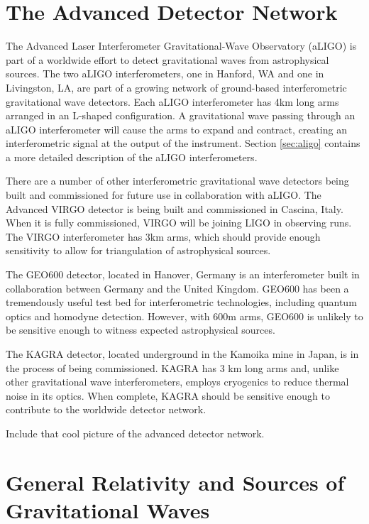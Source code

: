 \section{The Advanced Detector Network}

The Advanced Laser Interferometer Gravitational-Wave Observatory (aLIGO) is 
part of a worldwide effort to detect gravitational waves from astrophysical 
sources. The two aLIGO interferometers, one in Hanford, WA and one in 
Livingston, LA, are part of a growing network of ground-based interferometric 
gravitational wave detectors. Each aLIGO interferometer has 4km long arms 
arranged in an L-shaped configuration. A gravitational wave passing through 
an aLIGO interferometer will cause the arms to expand and contract, 
creating an interferometric signal at the output of the instrument. 
Section \ref{sec:aligo} contains a more detailed description of the aLIGO 
interferometers. 

There are a number of other interferometric gravitational wave detectors 
being built and commissioned for future use in collaboration with aLIGO.
The Advanced VIRGO detector is being built and commissioned in Cascina, Italy. 
When it is fully commissioned, VIRGO will be joining LIGO in observing runs. 
The VIRGO interferometer has 3km arms, which should provide enough 
sensitivity to allow for triangulation of astrophysical sources.

The GEO600 detector, located in Hanover, Germany is an interferometer built in 
collaboration between Germany and the United Kingdom. 
GEO600 has been a tremendously useful test bed for interferometric technologies,
including quantum optics and homodyne detection. However, with 600m arms, GEO600 
is unlikely to be sensitive enough to witness expected astrophysical sources.

The KAGRA detector, located underground in the Kamoika mine in Japan, 
is in the process of being commissioned. KAGRA has 3 km long arms and, 
unlike other gravitational wave interferometers, employs cryogenics to 
reduce thermal noise in its optics. When complete, KAGRA should be 
sensitive enough to contribute to the worldwide detector network.

Include that cool picture of the advanced detector network.


\section{General Relativity and Sources of Gravitational Waves}

